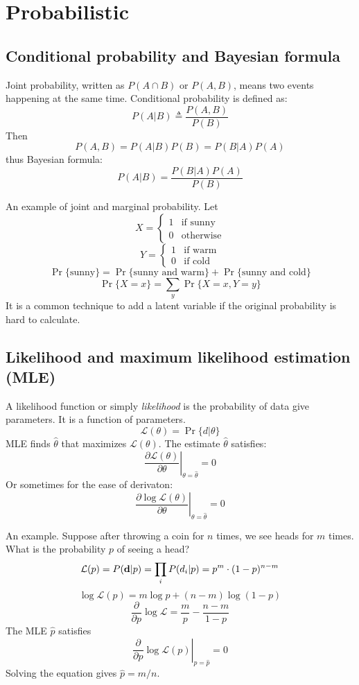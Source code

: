 \documentclass[10pt]{article}
\begin{document}
\section{Probabilistic}

\subsection{Conditional probability and Bayesian formula}

Joint probability, written as $P(A\cap B)$ or $P(A,B)$, means two events happening at the
same time.  Conditional probability is defined as:
$$
P(A|B)\triangleq\frac{P(A,B)}{P(B)}
$$
Then
$$
P(A,B)=P(A|B)P(B)=P(B|A)P(A)
$$
thus Bayesian formula:
$$
P(A|B)=\frac{P(B|A)P(A)}{P(B)}
$$

An example of joint and marginal probability. Let
$$
X=\left\{\begin{array}{ll}
1 & \mbox{if sunny} \\
0 & \mbox{otherwise}
\end{array}\right.
$$
$$
Y=\left\{\begin{array}{ll}
1 & \mbox{if warm} \\
0 & \mbox{if cold}
\end{array}\right.
$$
$$
\Pr\{\mbox{sunny}\}=\Pr\{\mbox{sunny and warm}\}+\Pr\{\mbox{sunny and cold}\}
$$
$$
\Pr\{X=x\}=\sum_y\Pr\{X=x,Y=y\}
$$
It is a common technique to add a latent variable if the original probability is hard to calculate.

\subsection{Likelihood and maximum likelihood estimation (MLE)}

A likelihood function or simply \emph{likelihood} is the probability of data
give parameters. It is a function of parameters.
$$
\mathcal{L}(\theta)=\Pr\{d|\theta\}
$$
MLE finds $\hat{\theta}$ that maximizes $\mathcal{L}(\theta)$.  The estimate
$\hat{\theta}$ satisfies:
$$
\left.\frac{\partial \mathcal{L}(\theta)}{\partial\theta}\right|_{\theta=\hat{\theta}}=0
$$
Or sometimes for the ease of derivaton:
$$
\left.\frac{\partial \log\mathcal{L}(\theta)}{\partial\theta}\right|_{\theta=\hat{\theta}}=0
$$

An example. Suppose after throwing a coin for $n$ times, we see heads for $m$ times.
What is the probability $p$ of seeing a head?
$$
\mathcal{L}(p)=P({\bf d}|p)=\prod_iP(d_i|p)=p^m\cdot(1-p)^{n-m}
$$
$$
\log\mathcal{L}(p)=m\log p+(n-m)\log(1-p)
$$
$$
\frac{\partial}{\partial p}\log\mathcal{L}=\frac{m}{p}-\frac{n-m}{1-p}
$$
The MLE $\hat{p}$ satisfies
$$
\left.\frac{\partial}{\partial p}\log\mathcal{L}(p)\right|_{p=\hat{p}}=0
$$
Solving the equation gives $\hat{p}=m/n$.
\end{document}
